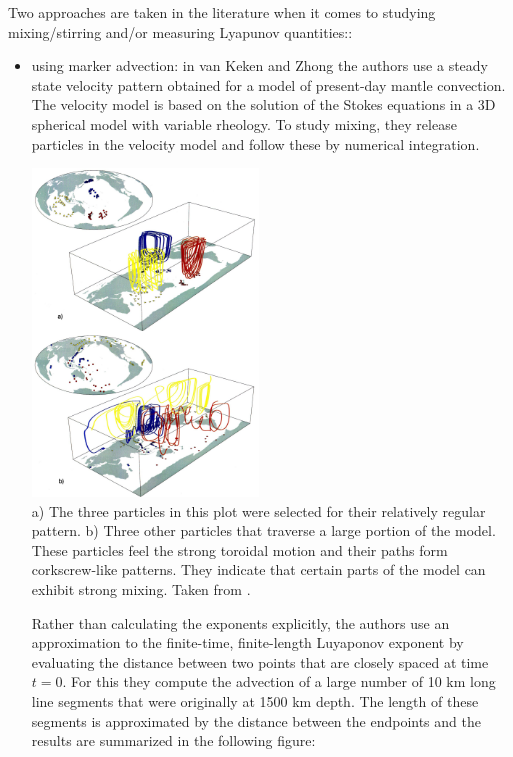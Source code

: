 Two approaches are taken in the literature when it comes to studying mixing/stirring and/or measuring Lyapunov quantities::

\begin{itemize}
\item using marker advection: in van Keken and Zhong \cite{vazh99} the authors use a steady state velocity
pattern obtained for a model of present-day mantle convection. The velocity model is
based on the solution of the Stokes equations in a 3D spherical model with variable rheology.
To study mixing, they release particles in the velocity model and follow 
these by numerical integration. 

\begin{center}
\includegraphics[width=6cm]{images/mixing/vazh99}\\
{\captionfont a) The three particles in this plot were
selected for their relatively regular pattern. 
b) Three other particles that traverse a large portion of the model. These particles feel 
the strong toroidal motion and their paths form corkscrew-like patterns. 
They indicate that certain parts of the model can exhibit strong mixing.  Taken from \cite{vazh99}.}
\end{center}

Rather than calculating the exponents explicitly, the authors 
use an approximation to the finite-time,
finite-length Luyaponov exponent by evaluating the distance between two points that are closely spaced
at time $t=0$. For this they compute the advection of a
large number of 10 km long line segments that were
originally at 1500 km depth. The length of these segments is approximated by the distance between the
endpoints and the results are summarized in the following figure:


\end{itemize}
